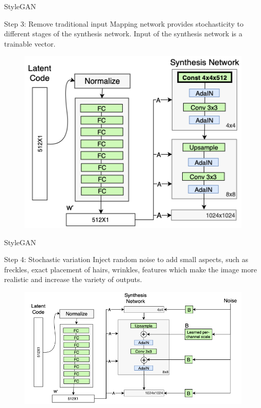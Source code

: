 \begin{frame}{StyleGAN}
	\begin{block}{Step 3: Remove traditional input}
		Mapping network provides stochasticity to different stages of the synthesis network. Input of the synthesis network is a trainable vector.
		\begin{figure}
			\centering
			\includegraphics[width=0.55\linewidth]{figs/stylegan_input}
		\end{figure}
	\end{block}

\end{frame}
\begin{frame}{StyleGAN}
	\begin{block}{Step 4: Stochastic variation}
		Inject random noise to add small aspects, such as freckles, exact placement of hairs, wrinkles, features which make the image more realistic and increase the variety of outputs.
		\begin{figure}
			\centering
			\includegraphics[width=0.9\linewidth]{figs/stylegan_noise}
		\end{figure}
	\end{block}

\end{frame}
